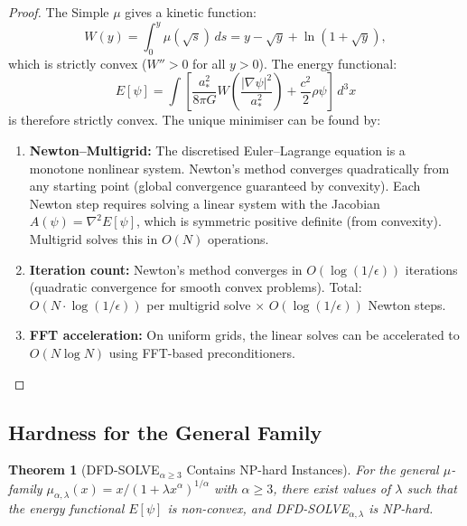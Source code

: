 \documentclass[11pt]{article}
\newtheorem{theorem}{Theorem}[section]
\theoremstyle{definition}
\theoremstyle{remark}
\begin{document}
\begin{proof}
The Simple $\mu$ gives a kinetic function:
\begin{equation}
  W(y) = \int_0^y \mu(\sqrt{s})\,ds = y - \sqrt{y} + \ln(1 + \sqrt{y}),
\end{equation}
which is strictly convex ($W'' > 0$ for all $y > 0$). The energy
functional:
\begin{equation}
  E[\psi] = \int \left[\frac{a_*^2}{8\pi G}W\!\left(\frac{|\nabla\psi|^2}{a_*^2}\right)
  + \frac{c^2}{2}\rho\psi\right]\,d^3x
\end{equation}
is therefore strictly convex. The unique minimiser can be found by:

\begin{enumerate}
\item \textbf{Newton--Multigrid:} The discretised Euler--Lagrange equation
  is a monotone nonlinear system. Newton's method converges quadratically
  from any starting point (global convergence guaranteed by convexity).
  Each Newton step requires solving a linear system with the Jacobian
  $A(\psi) = \nabla^2 E[\psi]$, which is symmetric positive definite
  (from convexity). Multigrid solves this in $O(N)$ operations.

\item \textbf{Iteration count:} Newton's method converges in
  $O(\log(1/\epsilon))$ iterations (quadratic convergence for smooth
  convex problems). Total: $O(N \cdot \log(1/\epsilon))$ per multigrid
  solve $\times$ $O(\log(1/\epsilon))$ Newton steps.

\item \textbf{FFT acceleration:} On uniform grids, the linear solves
  can be accelerated to $O(N \log N)$ using FFT-based preconditioners.
\end{enumerate}
\end{proof}

\subsection{Hardness for the General Family}
\label{sec:general-hardness}

\begin{theorem}[DFD-SOLVE$_{\alpha \geq 3}$ Contains NP-hard Instances]
\label{thm:np-hard}
For the general $\mu$-family $\mu_{\alpha,\lambda}(x) = x/(1 + \lambda x^\alpha)^{1/\alpha}$
with $\alpha \geq 3$, there exist values of $\lambda$ such that the energy
functional $E[\psi]$ is non-convex, and DFD-SOLVE$_{\alpha,\lambda}$ is
NP-hard.
\end{theorem}
\end{document}
